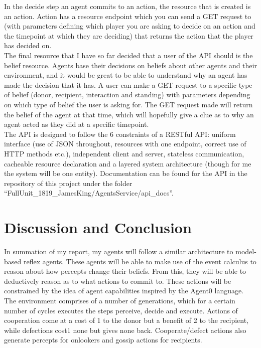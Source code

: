 \documentclass[twoside,twocolumn]{article}
\begin{document}
In the decide step an agent commits to an action, the resource that is created is an action. Action has a resource endpoint which you can send a GET request to (with parameters defining which player you are asking to decide on an action and the timepoint at which they are deciding) that returns the action that the player has decided on.\\
The final resource that I have so far decided that a user of the API should is the belief resource. Agents base their decisions on beliefs about other agents and their environment, and it would be great to be able to understand why an agent has made the decision that it has. A user can make a GET request to a specific type of belief (donor, recipient, interaction and standing) with parameters depending on which type of belief the user is asking for. The GET request made will return the belief of the agent at that time, which will hopefully give a clue as to why an agent acted as they did at a specific timepoint.\\
The API is designed to follow the 6 constraints of a RESTful API: uniform interface (use of JSON throughout, resources with one endpoint, correct use of HTTP methods etc.), independent client and server, stateless communication, cacheable resource declaration and a layered system architecture (though for me the system will be one entity). Documentation can be found for the API in the repository of this project under the folder ``FullUnit\_1819\_JamesKing/AgentsService/api\_docs''. 



\section{Discussion and Conclusion}
In summation of my report, my agents will follow a similar architecture to model-based reflex agents. These agents will be able to make use of the event calculus to reason about how percepts change their beliefs. From this, they will be able to deductively reason as to what actions to commit to. These actions will be constrained by the idea of agent capabilities inspired by the Agent0 language.\\
The environment comprises of a number of generations, which for a certain number of cycles executes the steps perceive, decide and execute. Actions of cooperation come at a cost of 1 to the donor but a benefit of 2 to the recipient, while defections cost1 none but gives none back. Cooperate/defect actions also generate percepts for onlookers and gossip actions for recipients.
\end{document}
